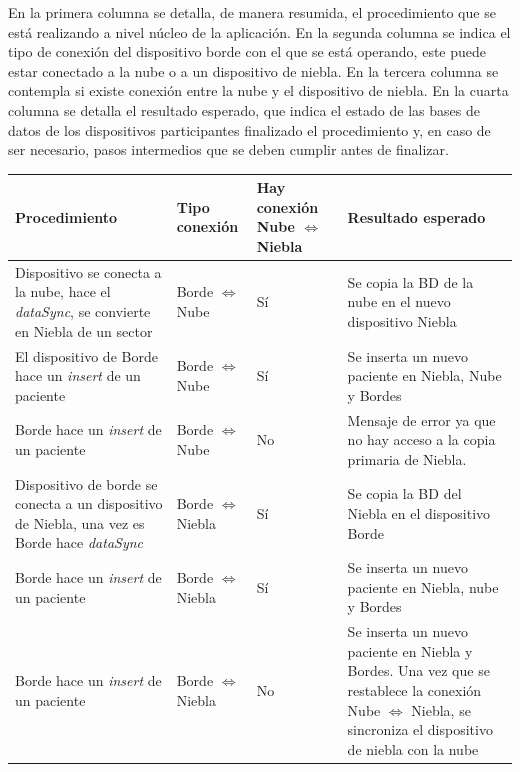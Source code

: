 En la primera columna se detalla, de manera resumida, el procedimiento que se está realizando a nivel núcleo de la aplicación. En la segunda columna se indica el tipo de conexión del dispositivo borde con el que se está operando, este puede estar conectado a la nube o a un dispositivo de niebla. En la tercera columna se contempla si existe conexión entre la nube y el dispositivo de niebla. En la cuarta columna se detalla el resultado esperado, que indica el estado de las bases de datos de los dispositivos participantes finalizado el procedimiento y, en caso de ser necesario, pasos intermedios que se deben cumplir antes de finalizar.


\begin{table}[h]

\label{tabla:evArq} 
\begin{tabular}{|m{5cm}|m{2.5cm}|m{2cm}|m{5cm}|} \hline           
    \centering\textbf{Procedimiento} & \centering\textbf{Tipo conexión} & \centering\textbf{Hay conexión Nube $\Leftrightarrow$ Niebla} & \begin{center}
        \textbf{Resultado esperado}
    \end{center}  \\
    
    \hline Dispositivo se conecta a la nube, hace el \textit{dataSync}, se convierte en Niebla de un sector & Borde $\Leftrightarrow$ Nube & Sí & Se copia la BD de la nube en el nuevo dispositivo Niebla  \\ 
    \hline El dispositivo de Borde hace un \textit{insert} de un paciente & Borde $\Leftrightarrow$ Nube & Sí & Se inserta un nuevo paciente en Niebla, Nube y Bordes\\
    \hline Borde hace un \textit{insert} de un paciente & Borde $\Leftrightarrow$ Nube & No & Mensaje de error ya que no hay acceso a la copia primaria de Niebla. \\
    \hline Dispositivo de borde se conecta a un dispositivo de Niebla, una vez es Borde hace \textit{dataSync} & Borde $\Leftrightarrow$ Niebla & Sí & Se copia la BD del Niebla en el dispositivo Borde \\
    \hline Borde hace un \textit{insert} de un paciente & Borde $\Leftrightarrow$ Niebla & Sí & Se inserta un nuevo paciente en Niebla, nube y Bordes \\
    \hline Borde hace un \textit{insert} de un paciente & Borde $\Leftrightarrow$ Niebla & No & Se inserta un nuevo paciente en Niebla y Bordes. Una vez que se restablece la conexión Nube $\Leftrightarrow$ Niebla, se sincroniza el dispositivo de niebla con la nube \\
    \hline\end{tabular} 

\end{table}

